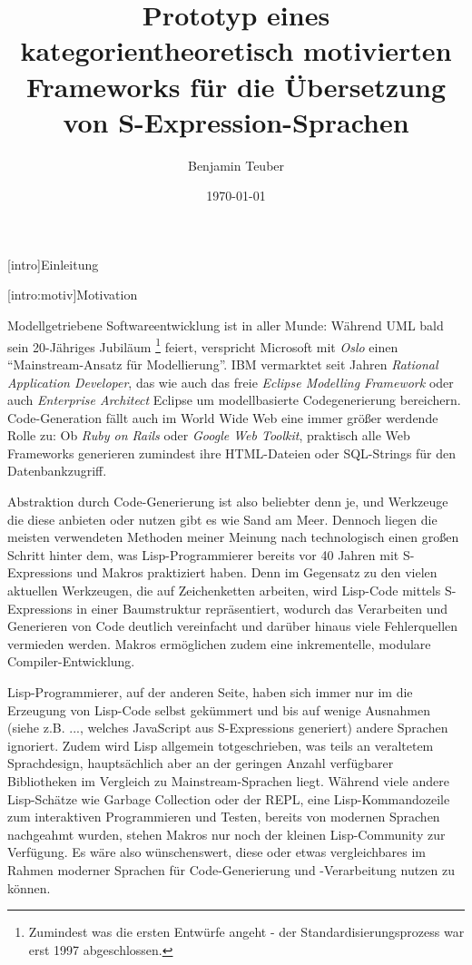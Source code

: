 \documentclass[a4paper, bibgerm]{article}
\newcommand\lsection{}
\newcommand\lsubsection{}
\begin{document}
\begin{titlepage}
\title{Prototyp eines kategorientheoretisch motivierten Frameworks
  für die Übersetzung von S-Expression-Sprachen}
\author{Benjamin Teuber}
\date{\today}

\maketitle  
\end{titlepage}

\tableofcontents


\lsection[intro]{Einleitung}

\lsubsection[intro:motiv]{Motivation}

Modellgetriebene Softwareentwicklung ist in aller Munde: Während UML
bald sein 20-Jähriges Jubiläum \footnote{Zumindest was die ersten
  Entwürfe angeht - der Standardisierungsprozess war erst 1997
  abgeschlossen.} feiert, verspricht Microsoft mit \textit{Oslo}
\cite{TODO} einen ``Mainstream-Ansatz für Modellierung''. IBM vermarktet
seit Jahren \textit{Rational Application Developer}, das wie auch das
freie \textit{Eclipse Modelling Framework} oder auch \textit{Enterprise
  Architect} Eclipse um modellbasierte Codegenerierung bereichern.
Code-Generation fällt auch im World Wide Web eine immer größer werdende
Rolle zu: Ob \textit{Ruby on Rails} oder \textit{Google Web Toolkit},
praktisch alle Web Frameworks generieren zumindest ihre HTML-Dateien oder
SQL-Strings für den Datenbankzugriff.

Abstraktion durch Code-Generierung ist also beliebter denn je, und
Werkzeuge die diese anbieten oder nutzen gibt es wie Sand am
Meer. Dennoch liegen die meisten verwendeten Methoden meiner Meinung
nach technologisch einen großen Schritt hinter dem, was
Lisp-Programmierer bereits vor 40 Jahren mit S-Expressions und Makros
praktiziert haben. Denn im Gegensatz zu den vielen aktuellen Werkzeugen,
die auf Zeichenketten arbeiten, wird Lisp-Code mittels S-Expressions in
einer Baumstruktur repräsentiert, wodurch das Verarbeiten und Generieren
von Code deutlich vereinfacht und darüber hinaus viele Fehlerquellen
vermieden werden. Makros ermöglichen zudem eine inkrementelle, modulare
Compiler-Entwicklung.

Lisp-Programmierer, auf der anderen Seite, haben sich immer nur im die
Erzeugung von Lisp-Code selbst gekümmert und bis auf wenige Ausnahmen
(siehe z.B. ..., welches JavaScript aus S-Expressions generiert) andere
Sprachen ignoriert. Zudem wird Lisp allgemein totgeschrieben, was teils
an veraltetem Sprachdesign, hauptsächlich aber an der geringen Anzahl
verfügbarer Bibliotheken im Vergleich zu Mainstream-Sprachen
liegt. Während viele andere Lisp-Schätze wie Garbage Collection oder der
REPL, eine Lisp-Kommandozeile zum interaktiven Programmieren und Testen,
bereits von modernen Sprachen nachgeahmt wurden, stehen Makros nur noch
der kleinen Lisp-Community zur Verfügung.
Es wäre also wünschenswert, diese oder etwas vergleichbares im Rahmen
moderner Sprachen für Code-Generierung und -Verarbeitung nutzen zu
können.
\end{document}
